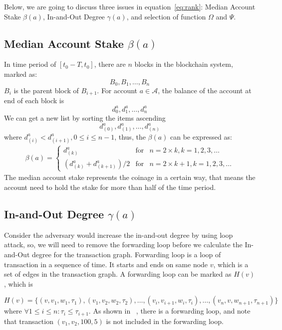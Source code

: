 Below, we are going to discuss three issues in equation~\ref{eq:rank}: Median Account Stake $\beta(a)$, In-and-Out Degree $\gamma(a)$, and selection of function $\Omega$ and $\Psi$.

\subsection{Median Account Stake $\beta(a)$}
In time period of $[t_0-T, t_0]$, there are $n$ blocks in the blockchain system, marked as:
\[
B_0, B_1, \dots, B_n
\]
\noindent $B_{i}$ is the parent block of $B_{i+1}$. For account $a \in \mathcal{A}$, the balance of the account at end of each block is
\[
d^a_0, d^a_1, \dots, d^a_n
\]
We can get a new list by sorting the items ascending 
\[
d^a_{(0)}, d^a_{(1)}, \dots, d^a_{(n)}
\]
\noindent where $d^a_{(i)} < d^a_{(i+1)}, 0\le i \le {n-1}$, thus, the $\beta(a)$ can be expressed as:
\begin{align}
\beta(a) = \left\{ \begin{array}{rcl}
{d^a_{(k)}} & \mbox{for} & n=2\times{}k, k=1, 2, 3, \ldots \\
{(d^a_{(k)} + d^a_{(k+1)})/2} & \mbox{for} & n=2\times{}k + 1, k=1, 2, 3, \ldots
\end{array}\right.
\end{align}
The median account stake represents the coinage in a certain way, that means the account need to hold the stake for more than half of the time period.

\subsection{In-and-Out Degree $\gamma(a)$}
Consider the adversary would increase the in-and-out degree by using loop attack, so, we will need to remove the forwarding loop before we calculate the In-and-Out degree for the transaction graph. Forwarding loop is a loop of transaction in a sequence of time.
It starts and ends on same node $v$, which is a set of edges in the transaction graph. A forwarding loop can be marked as $H(v)$, which is

\[
H(v) = \{(v, v_1, w_1, \tau_1), (v_1, v_2, w_2, \tau_2), \dots, (v_i, v_{i+1}, w_{i}, \tau_i), \dots, (v_n, v, w_{n+1}, \tau_{n+1})\}
\]
\noindent where $\forall 1\le i \le n : \tau_i \le \tau_{i+1} $.
\noindent As shown in ~, there is a forwarding loop, and note that transaction $(v_1, v_2, 100, 5)$ is not included in the forwarding loop.





